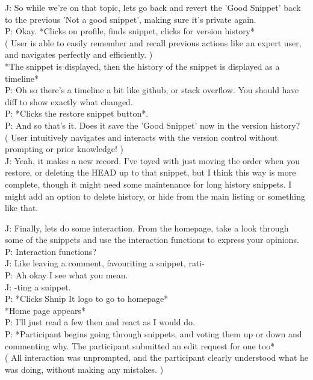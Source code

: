 J: \-\hspace{1.4cm}So while we're on that topic, lets go back and revert the 'Good Snippet' back to the previous 'Not a good snippet', making sure it's private again. \\
P: Okay. *Clicks on profile, finds snippet, clicks for version history* \\
( User is able to easily remember and recall previous actions like an expert user, and navigates perfectly and efficiently. ) \\
*The snippet is displayed, then the history of the snippet is displayed as a timeline* \\
P: Oh so there's a timeline a bit like github, or stack overflow. You should have diff to show exactly what changed. \\
P: *Clicks the restore snippet button*. \\
P: And so that's it. Does it save the 'Good Snippet' now in the version history? \\
( User intuitively navigates and interacts with the version control without prompting or prior knowledge! ) \\
J: \-\hspace{1.4cm}Yeah, it makes a new record. I've toyed with just moving the order when you restore, or deleting the HEAD up to that snippet, but I think this way is more complete, though it might need some maintenance for long history snippets. I might add an option to delete history, or hide from the main listing or something like that.

J: \-\hspace{1.4cm}Finally, lets do some interaction. From the homepage, take a look through some of the snippets and use the interaction functions to express your opinions. \\
P: Interaction functions? \\
J: \-\hspace{1.4cm}Like leaving a comment, favouriting a snippet, rati- \\
P: Ah okay I see what you mean.  \\
J: \-\hspace{1.4cm}-ting a snippet. \\
P: *Clicks Shnip It logo to go to homepage* \\
*Home page appears* \\
P: I'll just read a few then and react as I would do. \\
P: *Participant begins going through snippets, and voting them up or down and commenting why. The participant submitted an edit request for one too* \\
( All interaction was unprompted, and the participant clearly understood what he was doing, without making any mistakes. )

